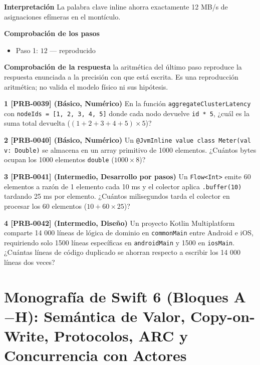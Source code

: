 \documentclass{book}
\begin{document}
\begin{tcolorbox}[title={Problema resuelto}, studiumworked, breakable]
\noindent\textbf{Interpretación}
La palabra clave inline ahorra exactamente 12 MB/s de asignaciones efímeras en el montículo.

\noindent\textbf{Comprobación de los pasos}
\begin{itemize}
\item Paso 1: $12$ — reproducido
\end{itemize}

\noindent\textbf{Comprobación de la respuesta} la aritmética del último paso reproduce la respuesta enunciada a la precisión con que está escrita. Es una reproducción aritmética; no valida el modelo físico ni sus hipótesis.
\end{tcolorbox}

\begin{tcolorbox}[title={Ejercicios}, studiumworked, breakable]

\noindent\textbf{1 [PRB-0039] (Básico, Numérico)}
En la función \texttt{aggregateClusterLatency} con \texttt{nodeIds = [1, 2, 3, 4, 5]} donde cada nodo devuelve \texttt{id * 5}, ¿cuál es la suma total devuelta (\((1 + 2 + 3 + 4 + 5) \times 5\))?

\noindent\textbf{2 [PRB-0040] (Básico, Numérico)}
Un \texttt{@JvmInline value class Meter(val v: Double)} se almacena en un array primitivo de 1000 elementos. ¿Cuántos bytes ocupan los 1000 elementos \texttt{double} (\(1000 \times 8\))?

\noindent\textbf{3 [PRB-0041] (Intermedio, Desarrollo por pasos)}
Un \texttt{Flow<Int>} emite 60 elementos a razón de 1 elemento cada 10 ms y el colector aplica \texttt{.buffer(10)} tardando 25 ms por elemento. ¿Cuántos milisegundos tarda el colector en procesar los 60 elementos (\(10 + 60 \times 25\))?

\noindent\textbf{4 [PRB-0042] (Intermedio, Diseño)}
Un proyecto Kotlin Multiplatform comparte 14 000 líneas de lógica de dominio en \texttt{commonMain} entre Android e iOS, requiriendo solo 1500 líneas específicas en \texttt{androidMain} y 1500 en \texttt{iosMain}. ¿Cuántas líneas de código duplicado se ahorran respecto a escribir los 14 000 líneas dos veces?
\end{tcolorbox}

\chapter{Monografía de Swift 6 (Bloques A\(-\)H): Semántica de Valor, Copy-on-Write, Protocolos, ARC y Concurrencia con Actores}
\label{chap:cap08-monografia-swift-valor-cow-protocolos-arc-actores}
\end{document}

